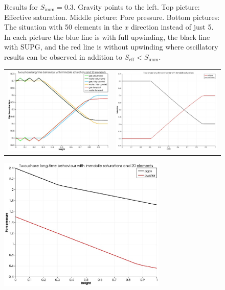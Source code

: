 \documentclass[]{scrreprt}
\begin{document}
\begin{figure}[htb]
\begin{tabular}{cc}
\end{tabular}
\caption{Results for $S_{\mathrm{imm}}=0.3$.  Gravity points to the
  left.  Top picture: Effective saturation.  Middle picture: Pore
  pressure.  Bottom pictures: The situation with 50 elements in the
  $x$ direction instead of just 5.  In each picture the blue line is
  with full upwinding, the black line with SUPG, and the red line is
  without upwinding where oscillatory results can be observed in addition to
  $S_{\mathrm{eff}}< S_{\mathrm{imm}}$.}
\label{gh.fig}
\end{figure}

\begin{figure}[htb]
\centering
\begin{tabular}{cc}
\includegraphics[width=8cm]{gh2_20.eps} &
\includegraphics[width=8cm]{gh2.eps}
\end{tabular}
\includegraphics[width=8cm]{gh2_p.eps} 

\end{figure}
\end{document}
